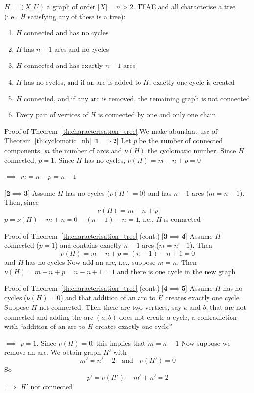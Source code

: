 \documentclass[aspectratio=43]{beamer}
\begin{document}
\begin{frame}
\begin{theorem}\label{th:characterisation_tree}
$H=(X,U)$ a graph of order $|X|=n>2$. TFAE and all characterise a tree (i.e., $H$ satisfying any of these is a tree):
\begin{enumerate}
\item $H$ connected and has no cycles
\item $H$ has $n-1$ arcs and no cycles
\item $H$ connected and has exactly $n-1$ arcs
\item $H$ has no cycles, and if an arc is added to $H$, exactly one cycle is created
\item $H$ connected, and if any arc is removed, the remaining graph is not
connected
\item Every pair of vertices of $H$ is connected by one and only one chain
\end{enumerate}
\end{theorem}
\end{frame}


\begin{frame}{Proof of Theorem~\ref{th:characterisation_tree}}
We make abundant use of Theorem~\ref{th:cyclomatic_nb}
\vfill
[$\mathbf{1\implies 2}$] 
Let $p$ be the number of connected components, $m$ the number of arcs and $\nu(H)$ the cyclomatic number. Since $H$ connected, $p=1$. Since $H$ has no cycles, $\nu(H)=m-n+p=0$

$\implies$ $m=n-p=n-1$
\vfill

[$\mathbf{2\implies 3}$] 
Assume $H$ has no cycles ($\nu(H)=0$) and has $n-1$ arcs ($m=n-1$). Then, since
\[
\nu(H)=m-n+p
\]
$p=\nu(H)-m+n=0-(n-1)-n=1$, i.e., $H$ is connected
\end{frame}

\begin{frame}{Proof of Theorem~\ref{th:characterisation_tree} (cont.)}
[$\mathbf{3\implies 4}$]
Assume $H$ connected ($p=1$) and contains exactly $n-1$ arcs ($m=n-1$). Then
\[
\nu(H)=m-n+p=(n-1)-n+1=0
\]
and $H$ has no cycles
\vskip0.5cm
Now add an arc, i.e., suppose $m=n$. Then $\nu(H)=m-n+p=n-n+1=1$ and there is one cycle in the new graph
\end{frame}


\begin{frame}{Proof of Theorem~\ref{th:characterisation_tree} (cont.)}
[$\mathbf{4\implies 5}$]
Assume $H$ has no cycles ($\nu(H)=0$) and that addition of an arc to $H$ creates exactly one cycle
\vskip0.5cm
Suppose $H$ not connected. Then there are two vertices, say $a$ and $b$, that are not connected and adding the arc $(a,b)$ does not create a cycle, a contradiction with ``addition of an arc to $H$ creates exactly one cycle'' 

$\implies$ $p=1$. Since $\nu(H)=0$, this implies that $m=n-1$
\vskip0.5cm
Now suppose we remove an arc. We obtain graph $H'$ with
\[
m'=n'-2\quad\text{and}\quad \nu(H')=0
\]
So
\[
p'=\nu(H')-m'+n'=2
\]
$\implies$ $H'$ not connected
\end{frame}
\end{document}
